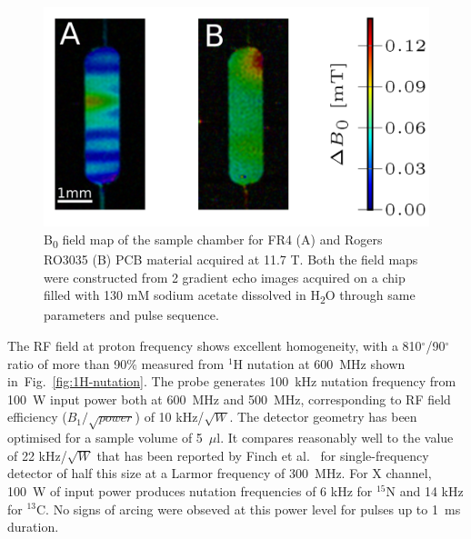 \documentclass[preprint,5p]{elsarticle}
\newcommand{\fig}[1]{Fig.~\ref{#1}}
\begin{document}
\cbstart
\begin{figure} \centering
\includegraphics[width=\linewidth,keepaspectratio=true]{./figures/pcb-fieldmap-colorbar.png}
\caption{B\textsubscript{0} field map of the sample chamber for FR4 (A) and
Rogers RO3035 (B) PCB material acquired at 11.7 T. Both the field maps were constructed from 2
gradient echo images acquired on a chip filled with 130 mM sodium acetate
dissolved in H\textsubscript{2}O through same parameters and pulse sequence.}
\label{fig:field map}
\end{figure}
\cbend
\cbdelete
The RF field at proton frequency shows excellent homogeneity, with a
810$^{\circ}$/90$^{\circ}$ ratio of more than 90\% measured from $^1$H nutation at 600~MHz shown in~\fig{fig:1H-nutation}. The
probe generates 100~kHz nutation frequency from 100~W input power both at
600~MHz and 500~MHz, corresponding to RF field efficiency ($B_{1}/\sqrt{power}$)
of 10 kHz/$\sqrt{W}$. The detector geometry has been optimised for a sample
volume of 5~$\mu$l. It compares reasonably well to the value of 22
kHz/$\sqrt{W}$ that has been reported by Finch et al.~\cite{gream_2016} for
single-frequency detector of half this size at a Larmor frequency of 300~MHz.
For X channel, 100~W of input power produces nutation frequencies of 6 kHz for
$^{15}$N and 14 kHz for $^{13}$C. No signs of arcing were obseved at this power
level for pulses up to 1~ms duration.
\end{document}
